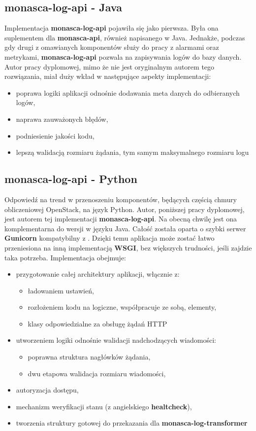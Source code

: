 \subsection{monasca-log-api - Java}
    Implementacja \textbf{monasca-log-api} pojawiła się jako pierwsza. Była ona suplementem dla \textbf{monasca-api}, również napisanego w Java.
    Jednakże, podczas gdy drugi z omawianych komponentów służy do pracy z alarmami oraz metrykami, \textbf{monasca-log-api} pozwala na zapisywania
    logów do bazy danych. Autor pracy dyplomowej, mimo że nie jest oryginalnym autorem tego rozwiązania, miał duży wkład w następujące aspekty
    implementacji:
    \begin{itemize}
        \item poprawa logiki aplikacji odnośnie dodawania meta danych do odbieranych logów,
        \item naprawa zauważonych błędów,
        \item podniesienie jakości kodu,
        \item lepszą walidacją rozmiaru żądania, tym samym maksymalnego rozmiaru logu
    \end{itemize}

\subsection{monasca-log-api - Python}
Odpowiedź na trend w przenoszeniu komponentów, będących częścią chmury obliczeniowej OpenStack, na język Python. Autor, poniższej pracy dyplomowej, jest autorem tej implementacji \textbf{monasca-log-api}. Na obecną chwilę jest ona komplementarna do wersji w języku Java. Całość została oparta o szybki serwer \textbf{Gunicorn} kompatybilny z . Dzięki
temu aplikacja może zostać łatwo przeniesiona na inną implementacją \textbf{WSGI}, bez większych trudności,
jeśli zajdzie taka potrzeba. Implementacja obejmuje:
\begin{itemize}
    \item przygotowanie całej architektury aplikacji, włącznie z:
    \begin{itemize}
        \item ładowaniem ustawień,
        \item rozłożeniem kodu na logiczne, współpracuje ze sobą, elementy,
        \item klasy odpowiedzialne za obsługę żądań HTTP
    \end{itemize}
    \item utworzeniem logiki odnośnie walidacji nadchodzących wiadomości:
    \begin{itemize}
        \item poprawna struktura nagłówków żądania,
        \item dwu etapowa walidacja rozmiaru wiadomości,
    \end{itemize}
    \item autoryzacja dostępu,
    \item mechanizm weryfikacji stanu (z angielskiego \textbf{healtcheck}),
    \item tworzenia struktury gotowej do przekazania dla \textbf{monasca-log-transformer}
\end{itemize}

